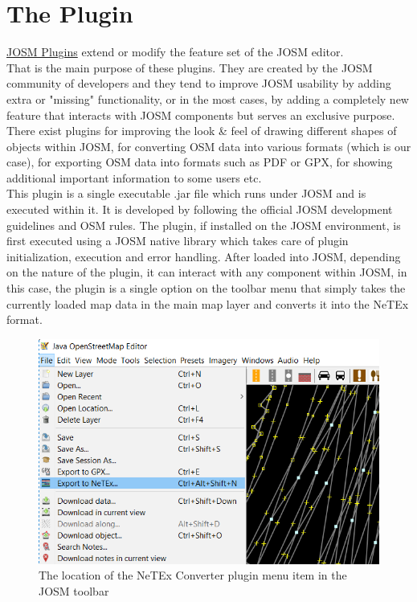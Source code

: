 \section{The Plugin}
\label{sec:ThePlugin}
\href{https://wiki.openstreetmap.org/wiki/JOSM/Plugins}{JOSM Plugins} extend or modify the feature set of the JOSM editor. \cite{JOSMPlugins}\\
That is the main purpose of these plugins. They are created by the JOSM community of developers and they tend to improve JOSM usability by adding extra or "missing" functionality, or in the most cases, by adding a completely new feature that interacts with JOSM components but serves an exclusive purpose.\\
There exist plugins for improving the look \& feel of drawing different shapes of objects within JOSM, for converting OSM data into various formats (which is our case), for exporting OSM data into formats such as PDF or GPX, for showing additional important information to some users etc.\\
\newline
This plugin is a single executable .jar file which runs under JOSM and is executed within it. It is developed by following the official JOSM development guidelines and OSM rules. The plugin, if installed on the JOSM environment, is first executed using a JOSM native library which takes care of plugin initialization, execution and error handling. After loaded into JOSM, depending on the nature of the plugin, it can interact with any component within JOSM, in this case, the plugin is a single option on the toolbar menu that simply takes the currently loaded map data in the main map layer and converts it into the NeTEx format. \\
\begin{figure}[H]
	\includegraphics[width=\linewidth]{./Images/ArchitectureDesign/netex_converter_toolbar.png}
	\caption{The location of the NeTEx Converter plugin menu item in the JOSM toolbar}
\end{figure}
